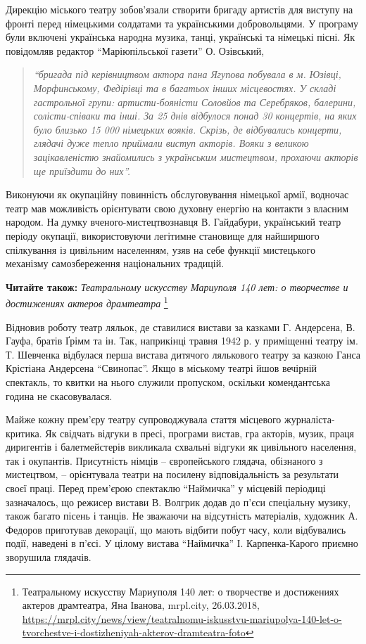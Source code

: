 Дирекцію міського театру зобов'язали створити бригаду артистів для виступу на
фронті перед німецькими солдатами та українськими добровольцями. У програму
були включені українська народна музика, танці, українські та німецькі пісні.
Як повідомляв редактор \enquote{Маріюпільської газети} О. Озівський, 

\begin{quote}
\em\enquote{бригада під
керівництвом актора пана Ягупова побувала в м. Юзівці, Морфинському, Федірівці
та в багатьох інших місцевостях. У складі гастрольної групи: артисти-бояністи
Соловйов та Серебряков, балерини, солісти-співаки та інші. За 25 днів відбулося
понад 30 концертів, на яких було близько 15 000 німецьких вояків. Скрізь, де
відбувались концерти, глядачі дуже тепло приймали виступ акторів. Вояки з
великою зацікавленістю знайомились з українським мистецтвом, прохаючи акторів
ще приїздити до них}.
\end{quote}

Виконуючи як окупаційну повинність обслуговування
німецької армії, водночас театр мав можливість орієнтувати свою духовну енергію
на контакти з власним народом. На думку вченого-мистецтвознавця В. Гайдабури,
український театр періоду окупації, використовуючи легітимне становище для
найширшого спілкування із цивільним населенням, узяв на себе функції
мистецького механізму самозбереження національних традицій.

\textbf{Читайте також:} \emph{Театральному искусству Мариуполя 140 лет: о творчестве и достижениях актеров драмтеатра}%
\footnote{Театральному искусству Мариуполя 140 лет: о творчестве и достижениях актеров драмтеатра, Яна Іванова, mrpl.city, 26.03.2018, \url{https://mrpl.city/news/view/teatralnomu-iskusstvu-mariupolya-140-let-o-tvorchestve-i-dostizheniyah-akterov-dramteatra-foto}}

Відновив роботу театр ляльок, де ставилися вистави за казками Г. Андерсена, В.
Гауфа, братів Ґрімм та ін. Так, наприкінці травня 1942 р. у приміщенні театру
ім. Т. Шевченка відбулася перша вистава дитячого лялькового театру за казкою
Ганса Крістіана Андерсена \enquote{Свинопас}. Якщо в міському театрі йшов
вечірній спектакль, то квитки на нього служили пропуском, оскільки
комендантська година не скасовувалася.

Майже кожну прем'єру театру супроводжувала стаття місцевого журналіста-критика.
Як свідчать відгуки в пресі, програми вистав, гра акторів, музик, праця
диригентів і балетмейстерів викликала схвальні відгуки як цивільного населення,
так і окупантів. Присутність німців – європейського глядача, обізнаного з
мистецтвом, – орієнтувала театри на посилену відповідальність за результати
своєї праці. Перед прем'єрою спектаклю \enquote{Наймичка} у місцевій періодиці
зазначалось, що режисер вистави В. Волгрик додав до п'єси спеціальну музику,
також багато пісень і танців. Не зважаючи на відсутність матеріалів, художник
А. Федоров приготував декорації, що мають відбити побут часу, коли відбувались
події, наведені в п'єсі. У цілому вистава \enquote{Наймичка} І. Карпенка-Карого
приємно зворушила глядачів.

